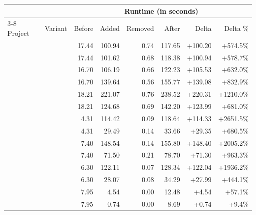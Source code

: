   \begin{tabular*}{\linewidth}{@{\hspace{\tabcolsep}\extracolsep{\fill}}llrrrrrr}
  \toprule
   &  & \multicolumn{6}{c}{Runtime (in seconds)} \\
  \cmidrule(lr){3-8}
  Project & Variant & Before & Added & Removed & After & Delta & Delta \% \\
  \midrule
  \DatasetEqBenchA{} & \VariantNaiveC{} & 17.44 & 100.94 & 0.74 & 117.65 & +100.20 & +574.5\% \\
  \DatasetEqBenchA{} & \VariantImprovedC{} & 17.44 & 101.62 & 0.68 & 118.38 & +100.94 & +578.7\% \\
  \DatasetEqBenchB{} & \VariantNaiveC{} & 16.70 & 106.19 & 0.66 & 122.23 & +105.53 & +632.0\% \\
  \DatasetEqBenchB{} & \VariantImprovedC{} & 16.70 & 139.64 & 0.56 & 155.77 & +139.08 & +832.9\% \\
  \DatasetEqBenchC{} & \VariantNaiveC{} & 18.21 & 221.07 & 0.76 & 238.52 & +220.31 & +1210.0\% \\
  \DatasetEqBenchC{} & \VariantImprovedC{} & 18.21 & 124.68 & 0.69 & 142.20 & +123.99 & +681.0\% \\
  \midrule
  \DatasetCommonsA{} & \VariantNaiveC{} & 4.31 & 114.42 & 0.09 & 118.64 & +114.33 & +2651.5\% \\
  \DatasetCommonsA{} & \VariantImprovedC{} & 4.31 & 29.49 & 0.14 & 33.66 & +29.35 & +680.5\% \\
  \DatasetCommonsB{} & \VariantNaiveC{} & 7.40 & 148.54 & 0.14 & 155.80 & +148.40 & +2005.2\% \\
  \DatasetCommonsB{} & \VariantImprovedC{} & 7.40 & 71.50 & 0.21 & 78.70 & +71.30 & +963.3\% \\
  \DatasetCommonsC{} & \VariantNaiveC{} & 6.30 & 122.11 & 0.07 & 128.34 & +122.04 & +1936.2\% \\
  \DatasetCommonsC{} & \VariantImprovedC{} & 6.30 & 28.07 & 0.08 & 34.29 & +27.99 & +444.1\% \\
  \midrule
  \DatasetCommonsDev{} & \VariantNaiveC{} & 7.95 & 4.54 & 0.00 & 12.48 & +4.54 & +57.1\% \\
  \DatasetCommonsDev{} & \VariantImprovedC{} & 7.95 & 0.74 & 0.00 & 8.69 & +0.74 & +9.4\% \\
  \bottomrule
  \end{tabular*}
